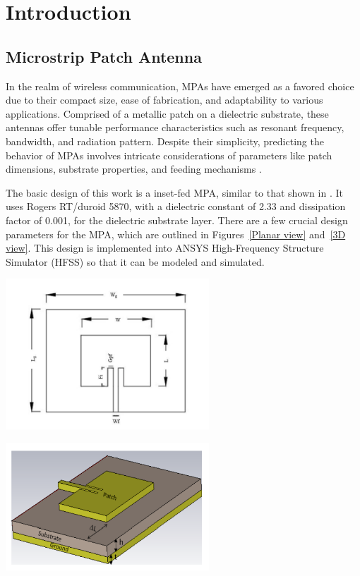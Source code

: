 \documentclass[conference]{IEEEtran}
\newenvironment{Figure}
    {\par\medskip\noindent\minipage{\linewidth}}
    {\endminipage\par\medskip}
\begin{document}
\section{Introduction}
\subsection{Microstrip Patch Antenna}
In the realm of wireless communication, MPAs have emerged as a favored choice due to their compact size, ease of fabrication, and adaptability to various applications. Comprised of a metallic patch on a dielectric substrate, these antennas offer tunable performance characteristics such as resonant frequency, bandwidth, and radiation pattern. Despite their simplicity, predicting the behavior of MPAs involves intricate considerations of parameters like patch dimensions, substrate properties, and feeding mechanisms \cite{Patch_antennas}.

The basic design of this work is a inset-fed MPA, similar to that shown in \cite{inset_feed_pa}. It uses Rogers RT/duroid 5870, with a dielectric constant of 2.33 and dissipation factor of 0.001, for the dielectric substrate layer. There are a few crucial design parameters for the MPA, which are outlined in Figures~\ref{Planar view} and~\ref{3D view}. This design is implemented into ANSYS High-Frequency Structure Simulator (HFSS) so that it can be modeled and simulated. 

\begin{Figure}
    \centering
    \includegraphics[width=3in]{inset_fed patch antenna.png}
    \label{Planar view}
\end{Figure}


\begin{Figure}
    \centering
    \includegraphics[width=3in]{3D patch antenna.png}
    \label{3D view}
\end{Figure}
\end{document}
